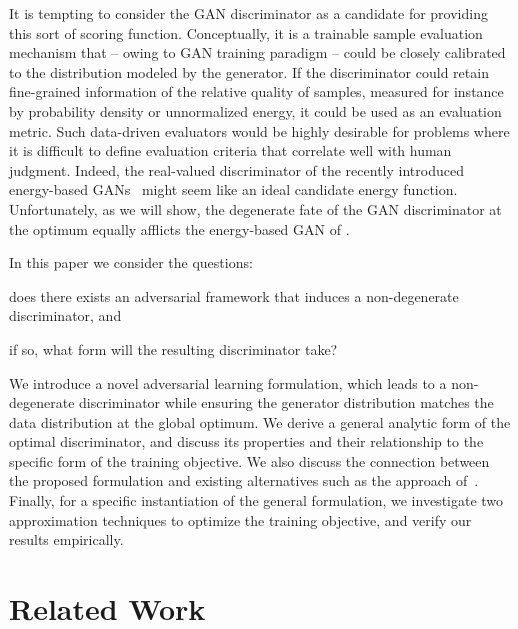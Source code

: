 \documentclass[a4paper]{article}
\begin{document}
It is tempting to consider the GAN discriminator as a candidate for providing this sort of scoring function. Conceptually, it is a trainable sample evaluation mechanism that -- owing to GAN training paradigm -- could be closely calibrated to the distribution modeled by the generator. 
If the discriminator could retain fine-grained information of the relative quality of samples, measured for instance by probability density or unnormalized energy, it could be used as an evaluation metric.
Such data-driven evaluators would be highly desirable for problems where it is difficult to define evaluation criteria that correlate well with human judgment.
Indeed, the real-valued discriminator of the recently introduced energy-based GANs~\cite{zhao2016energy} might seem like an ideal candidate energy function.
Unfortunately, as we will show, the degenerate fate of the GAN discriminator at the optimum equally afflicts the energy-based GAN of \citeauthor{zhao2016energy}.




In this paper we consider the questions:
\begin{inlinelist}
	\item does there exists an adversarial framework that induces a non-degenerate discriminator, and
	\item if so, what form will the resulting discriminator take? 
\end{inlinelist}
We introduce a novel adversarial learning formulation, which leads to a non-degenerate discriminator while ensuring the generator distribution matches the data distribution at the global optimum. 
We derive a general analytic form of the optimal discriminator, and discuss its properties and their relationship to the specific form of the training objective.
We also discuss the connection between the proposed formulation and existing alternatives such as the approach of~\cite{kim2016deep}.
Finally, for a specific instantiation of the general formulation, we investigate two approximation techniques to optimize the training objective, and verify our results empirically.






 \section{Related Work}
\label{sec:related_work}
\end{document}
